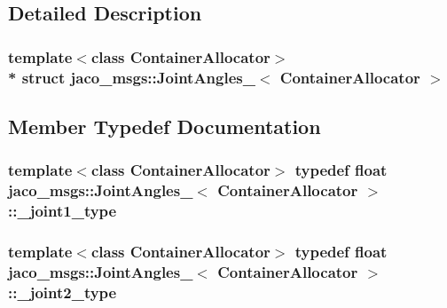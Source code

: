 \subsection{Detailed Description}
\subsubsection*{template$<$class Container\+Allocator$>$\\*
struct jaco\+\_\+msgs\+::\+Joint\+Angles\+\_\+$<$ Container\+Allocator $>$}



\subsection{Member Typedef Documentation}
\subsubsection[{\texorpdfstring{\+\_\+joint1\+\_\+type}{_joint1_type}}]{\setlength{\rightskip}{0pt plus 5cm}template$<$class Container\+Allocator$>$ typedef float {\bf jaco\+\_\+msgs\+::\+Joint\+Angles\+\_\+}$<$ Container\+Allocator $>$\+::{\bf \+\_\+joint1\+\_\+type}}\hypertarget{structjaco__msgs_1_1JointAngles___ad68900048ed8b91940a224d1c39a1b0d}{}\label{structjaco__msgs_1_1JointAngles___ad68900048ed8b91940a224d1c39a1b0d}
\subsubsection[{\texorpdfstring{\+\_\+joint2\+\_\+type}{_joint2_type}}]{\setlength{\rightskip}{0pt plus 5cm}template$<$class Container\+Allocator$>$ typedef float {\bf jaco\+\_\+msgs\+::\+Joint\+Angles\+\_\+}$<$ Container\+Allocator $>$\+::{\bf \+\_\+joint2\+\_\+type}}\hypertarget{structjaco__msgs_1_1JointAngles___a7908a1dd9bd0a8b94bfaccdb54237faa}{}\label{structjaco__msgs_1_1JointAngles___a7908a1dd9bd0a8b94bfaccdb54237faa}

